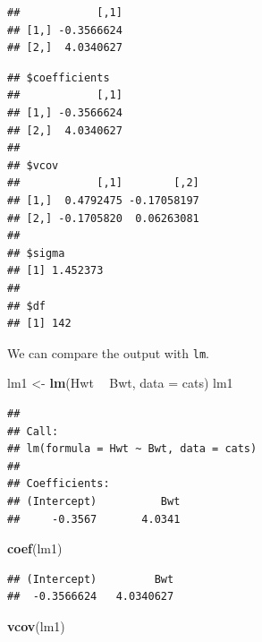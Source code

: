 \documentclass[]{book}
\newenvironment{Shaded}{\begin{snugshade}}{\end{snugshade}}
\newcommand{\KeywordTok}[1]{\textcolor[rgb]{0.13,0.29,0.53}{\textbf{#1}}}
\newcommand{\DataTypeTok}[1]{\textcolor[rgb]{0.13,0.29,0.53}{#1}}
\newcommand{\DecValTok}[1]{\textcolor[rgb]{0.00,0.00,0.81}{#1}}
\newcommand{\StringTok}[1]{\textcolor[rgb]{0.31,0.60,0.02}{#1}}
\newcommand{\OperatorTok}[1]{\textcolor[rgb]{0.81,0.36,0.00}{\textbf{#1}}}
\newcommand{\NormalTok}[1]{#1}
\theoremstyle{definition}
\theoremstyle{definition}
\theoremstyle{definition}
\theoremstyle{remark}
\begin{document}
\begin{Shaded}
\end{Shaded}

\begin{verbatim}
##            [,1]
## [1,] -0.3566624
## [2,]  4.0340627
\end{verbatim}

\begin{verbatim}
## $coefficients
##            [,1]
## [1,] -0.3566624
## [2,]  4.0340627
## 
## $vcov
##            [,1]        [,2]
## [1,]  0.4792475 -0.17058197
## [2,] -0.1705820  0.06263081
## 
## $sigma
## [1] 1.452373
## 
## $df
## [1] 142
\end{verbatim}

We can compare the output with \texttt{lm}.

\begin{Shaded}
\begin{Highlighting}[]
\NormalTok{lm1 <-}\StringTok{ }\KeywordTok{lm}\NormalTok{(Hwt }\OperatorTok{~}\StringTok{ }\NormalTok{Bwt, }\DataTypeTok{data =}\NormalTok{ cats)}
\NormalTok{lm1}
\end{Highlighting}
\end{Shaded}

\begin{verbatim}
## 
## Call:
## lm(formula = Hwt ~ Bwt, data = cats)
## 
## Coefficients:
## (Intercept)          Bwt  
##     -0.3567       4.0341
\end{verbatim}

\begin{Shaded}
\begin{Highlighting}[]
\KeywordTok{coef}\NormalTok{(lm1)}
\end{Highlighting}
\end{Shaded}

\begin{verbatim}
## (Intercept)         Bwt 
##  -0.3566624   4.0340627
\end{verbatim}

\begin{Shaded}
\begin{Highlighting}[]
\KeywordTok{vcov}\NormalTok{(lm1)}
\end{Highlighting}
\end{Shaded}
\end{document}
